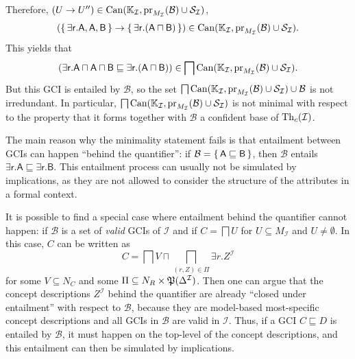 \begin{Example}
  Therefore, $(U \to U'') \in \operatorname{Can}({\mathbb{K}}_{\mathcal{I}},
  \operatorname{pr}_{M_{\mathcal{I}}}(\mathcal{B}) \cup \mathcal{S}_{\mathcal{I}})$, \ie
  \begin{equation*}
    ({\{\, \mathsf{\exists r. A}, \mathsf{A}, \mathsf{B} \,\}} \to {\ensuremath{\{\, \mathsf{\exists r. (A
        \sqcap B)} \,\}}}) \in \operatorname{Can}({\mathbb{K}}_{\mathcal{I}}, \operatorname{pr}_{M_{\mathcal{I}}}(\mathcal{B}) \cup
    \mathcal{S}_{\mathcal{I}}).
  \end{equation*}
  This yields that
  \begin{equation*}
    (\mathsf{\exists r. A \sqcap A \sqcap B} \sqsubseteq \mathsf{\exists r. (A \sqcap B)})
    \in \bigsqcap \operatorname{Can}({\mathbb{K}}_{\mathcal{I}}, \operatorname{pr}_{M_{\mathcal{I}}}(\mathcal{B}) \cup \mathcal{S}_{\mathcal{I}}).
  \end{equation*}
  But this GCI is entailed by $\mathcal{B}$, so the set $\bigsqcap \operatorname{Can}({\mathbb{K}}_{\mathcal{I}}, \operatorname{pr}_{M_{\mathcal{I}}}(\mathcal{B}) \cup \mathcal{S}_{\mathcal{I}}) \cup
  \mathcal{B}$ is not irredundant.  In particular, $\bigsqcap \operatorname{Can}({\mathbb{K}}_{\mathcal{I}},
  \operatorname{pr}_{M_{\mathcal{I}}}(\mathcal{B}) \cup \mathcal{S}_{\mathcal{I}})$ is not minimal with
  respect to the property that it forms together with $\mathcal{B}$ a confident base of
  $\operatorname{Th}_c(\mathcal{I})$.
\end{Example}

The main reason why the minimality statement fails is that entailment between GCIs can
happen ``behind the quantifier'': if $\mathcal{B} = {\{\, \mathsf{A} \sqsubseteq
  \mathsf{B} \,\}}$, then $\mathcal{B}$ entails $\mathsf{\exists r. A} \sqsubseteq
\mathsf{\exists r. B}$.  This entailment process can usually not be simulated by
implications, as they are not allowed to consider the structure of the attributes in a
formal context.

It is possible to find a special case where entailment behind the quantifier cannot
happen: if $\mathcal{B}$ is a set of \emph{valid} GCIs of $\mathcal{I}$ and if $C =
\bigsqcap U$ for $U \subseteq M_{\mathcal{I}}$ and $U \neq \emptyset$.  In this case, $C$
can be written as
\begin{equation*}
  C = \bigsqcap V \sqcap \bigsqcap_{(r, Z) \in \Pi} \exists r. Z^{\mathcal{I}}
\end{equation*}
for some $V \subseteq N_C$ and some $\Pi \subseteq N_R \times
{\ensuremath{\mathfrak{P}(\Delta^{\mathcal{I}})}}$.  Then one can argue that the concept descriptions
$Z^{\mathcal{I}}$ behind the quantifier are already ``closed under entailment'' with
respect to $\mathcal{B}$, because they are model-based most-specific concept descriptions
and all GCIs in $\mathcal{B}$ are valid in $\mathcal{I}$.  Thus, if a GCI $C \sqsubseteq
D$ is entailed by $\mathcal{B}$, it must happen on the top-level of the concept
descriptions, and this entailment can then be simulated by implications.

